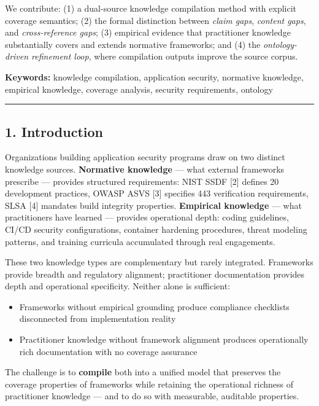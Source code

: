 \documentclass[
]{article}
\providecommand{\tightlist}{%
  \setlength{\itemsep}{0pt}\setlength{\parskip}{0pt}}
\begin{document}
We contribute: (1) a dual-source knowledge compilation method with
explicit coverage semantics; (2) the formal distinction between
\emph{claim gaps}, \emph{content gaps}, and \emph{cross-reference gaps};
(3) empirical evidence that practitioner knowledge substantially covers
and extends normative frameworks; and (4) the \emph{ontology-driven
refinement loop}, where compilation outputs improve the source corpus.

\textbf{Keywords:} knowledge compilation, application security,
normative knowledge, empirical knowledge, coverage analysis, security
requirements, ontology

\begin{center}\rule{0.5\linewidth}{0.5pt}\end{center}

\subsection{1. Introduction}\label{introduction}

Organizations building application security programs draw on two
distinct knowledge sources. \textbf{Normative knowledge} --- what
external frameworks prescribe --- provides structured requirements: NIST
SSDF {[}2{]} defines 20 development practices, OWASP ASVS {[}3{]}
specifies 443 verification requirements, SLSA {[}4{]} mandates build
integrity properties. \textbf{Empirical knowledge} --- what
practitioners have learned --- provides operational depth: coding
guidelines, CI/CD security configurations, container hardening
procedures, threat modeling patterns, and training curricula accumulated
through real engagements.

These two knowledge types are complementary but rarely integrated.
Frameworks provide breadth and regulatory alignment; practitioner
documentation provides depth and operational specificity. Neither alone
is sufficient:

\begin{itemize}
\tightlist
\item
  Frameworks without empirical grounding produce compliance checklists
  disconnected from implementation reality
\item
  Practitioner knowledge without framework alignment produces
  operationally rich documentation with no coverage assurance
\end{itemize}

The challenge is to \textbf{compile} both into a unified model that
preserves the coverage properties of frameworks while retaining the
operational richness of practitioner knowledge --- and to do so with
measurable, auditable properties.
\end{document}
